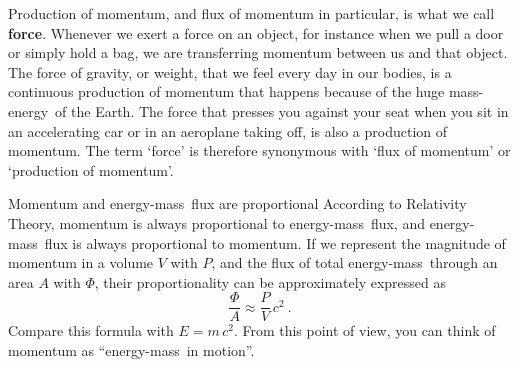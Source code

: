 \documentclass[a4paper,12pt,%
onecolumn,oneside,%
british%
]{memoir}
\renewcommand*{\bm}[1]{\textpdfrender{TextRenderingMode=2,LineWidth=0.2pt}{\boldsymbol{#1}}}
\renewcommand*{\|}[1][]{\nonscript\:#1\vert\nonscript\:\mathopen{}}
\newcommand*{\chap}{chapter}%
\newcommand*{\energym}{energy-mass}
\newcommand*{\masse}{mass-energy}
\newcommand*{\yc}{c} %
\newcommand*{\ym}{m}%
\newcommand*{\yE}{E}
\newcommand*{\yH}{\varPhi}%
\begin{document}
\medskip

Production of momentum, and flux of momentum in particular, is what we call \textbf{force}. Whenever we exert a force on an object, for instance when we pull a door or simply hold a bag, we are transferring momentum between us and that object. The force of gravity, or weight, that we feel every day in our bodies, is a continuous production of momentum that happens because of the huge \masse\ of the Earth. The force that presses you against your seat when you sit in an accelerating car or in an aeroplane taking off, is also a production of momentum. The term \enquote*{force} is therefore synonymous with \enquote*{flux of momentum} or \enquote*{production of momentum}.



\begin{extra}{Momentum and \energym\ flux are proportional}
  According to Relativity Theory, momentum is always proportional to \energym\ flux, and \energym\ flux is always proportional to momentum. If we represent the magnitude of momentum in a volume $V$ with $P$, and the flux of total \energym\ through an area $A$ with $\yH$, their proportionality can be approximately expressed as
  \begin{equation}
    \label{eq:momentum_heat}
    \frac{\yH}{A} \approx \frac{P}{V}\,\yc^{2} \ .
  \end{equation}
  Compare this formula with $\yE=\ym\,\yc^{2}$. From this point of view, you can think of momentum as \enquote{\energym\ in motion}. %
\end{extra}
\end{document}
